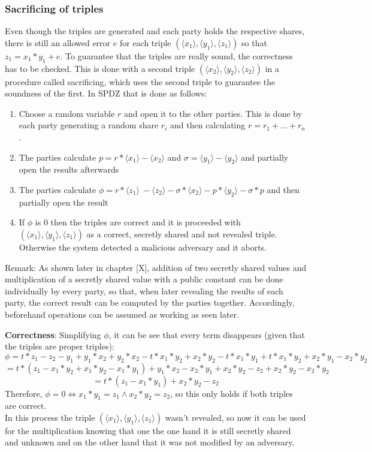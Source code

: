 \documentclass[english,runningheads,a4paper]{llncs}[2018/03/10]
\begin{document}
\subsubsection{Sacrificing of triples}
Even though the triples are generated and each party holds the respective shares, there is still an allowed error \(e\) for each triple \( (\langle x_1 \rangle ,\langle y_1\rangle , \langle z_1\rangle )\) so that \(z_1=x_1*y_1+e\). To guarantee that the triples are really sound, the correctness has to be checked. This is done with a second triple \( (\langle x_2 \rangle ,\langle y_2\rangle ,\langle z_2\rangle )\) in a procedure called sacrificing, which uses the second triple to guarantee the soundness of the first. In SPDZ that is done as follows:\\
\begin{enumerate}
\item Choose a random variable \( r\) and open it to the other parties. This is done by each party generating a random share \(r_i\) and then calculating \(r=r_1+...+r_n\).
\item The parties calculate  \( p=r*\langle x_1 \rangle - \langle x_2 \rangle \) and \( \sigma=\langle y_1 \rangle -  \langle y_2 \rangle \) and partially open the results afterwards
\item The parties calculate \(\phi = r * \langle z_1 \rangle\ - \langle z_2 \rangle - \sigma * \langle x_2 \rangle - p * \langle y_2 \rangle - \sigma * p\) and then partially open the result
\item If \( \phi \) is 0 then the triples are correct and it is proceeded with \( (\langle x_1 \rangle ,\langle y_1\rangle , \langle z_1\rangle )\) as a correct, secretly shared and not revealed triple. Otherwise the system detected a malicious adversary and it aborts.\\
\end{enumerate}

Remark: As shown later in chapter [X], addition of two secretly shared values and multiplication of a secretly shared value with a public constant can be done individually by every party, so that, when later revealing the results of each party, the correct result can be computed by the parties together. Accordingly, beforehand operations can be assumed as working as seen later.

\textbf{Correctness}: Simplifying \( \phi \), it can be see that every term disappears (given that the triples are proper triples):
$$\phi = t*z_1 - z_2 - y_1 + y_1*x_2 + y_2 * x_2 - t * x_1 * y_2 + x_2*y_2 - t*x_1*y_1 + t*x_1*y_2 + x_2*y_1 - x_2*y_2$$
$$ = t*(z_1 - x_1*y_2+x_1*y_2 -x_1*y_1) + y_1*x_2 - x_2*y_1+ x_2*y_2 - z_2 + x_2*y_2 -  x_2*y_2$$
$$= t* (z_1 - x_1*y_1) + x_2*y_2 - z_2 $$
Therefore, \( \phi = 0 \Leftrightarrow x_1 * y_1 = z_1 \land x_2*y_2=z_2 \), so this only holds if both triples are correct. \\
In this process the triple \( (\langle x_1 \rangle ,\langle y_1\rangle , \langle z_1\rangle ) \) wasn't revealed, so now it can be used for the multiplication knowing that one the one hand it is still secretly shared and unknown and on the other hand that it was not modified by an adversary.\\
\end{document}

